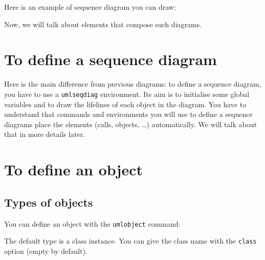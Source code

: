 \documentclass[a4paper,11pt]{report}
\begin{document}
Here is an example of sequence diagram you can draw:

\begin{center}
\end{center}

Now, we will talk about elements that compose such diagrams.

\section{To define a sequence diagram}\label{s.seqdiag}

Here is the main difference from previous diagrams: to define a sequence diagram, you have to use a {\tt umlseqdiag} environment.
Its aim is to initialise some global variables and to draw the lifelines of each object in the diagram. You have to understand that commands and environments you will use to define a sequence diagrams place the elements (calls, objects, \ldots ) automatically. We will talk about that in more details later.

\section{To define an object}\label{s.objs}

\subsection{Types of objects}\label{ss.obj}

You can define an object with the {\tt umlobject} command:

\medskip

\begin{minipage}{0.5\textwidth}

\end{minipage}
\begin{minipage}{0.5\textwidth}
\begin{center}
\end{center}
\end{minipage}

\medskip

The default type is a class instance. You can give the class name with the {\tt class} option (empty by default).

\medskip

\begin{minipage}{0.5\textwidth}

\end{minipage}
\begin{minipage}{0.5\textwidth}
\begin{center}
\end{center}
\end{minipage}
\end{document}

